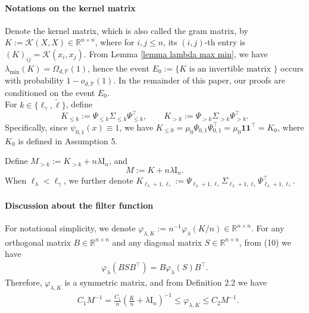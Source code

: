 \documentclass{article}
\theoremstyle{plain}
\theoremstyle{definition}
\theoremstyle{remark}
\newcommand{\reg}{\varphi_\lambda}
\begin{document}
\begin{appendix}
\paragraph*{Notations on the kernel matrix}
Denote the kernel matrix, which is also called the gram matrix, by $K := \mathscr{K}(X, X) \in \mathbb{R}^{n \times n}$, where for $i,j \leq n$, its $(i, j)$-th entry is $(K)_{ij} = \mathscr{K}(x_{i},x_{j})$. From Lemma \ref{lemma lambda max min}, we have $\lambda_{\text{min}}\left( K\right) = \Omega_{d, \mathbb{P}}(1)$, hence the event $E_0 := \{K \text{ is an invertible matrix }\}$ occurs with probability $1-o_{d, \mathbb{P}}(1)$. In the remainder of this paper, our proofs are conditioned on the event $E_0$.\\
For $k \in \{\ell_{\gamma}, \tilde{\ell}\}$, define
$$
K_{\leq k} := \Psi_{\leq k} \Sigma_{\leq k} \Psi_{\leq k}^{\top}, 
\qquad 
K_{>k} := \Psi_{>k} \Sigma_{>k} \Psi_{>k}^{\top}. 
$$
Specifically, since $\psi_{0, 1}(x) \equiv 1$, we have $K_{\leq 0} = \mu_0 \Psi_{0, 1} \Psi_{0, 1}^{\top} = \mu_0 \mathbf{1} \mathbf{1}^{\top} = K_0$, where $K_{0}$ is defined in Assumption 5.

Define $M_{>k} := K_{>k} + n\lambda \mathrm{I}_n$, and
$$
M := K + n\lambda \mathrm{I}_n.
$$
When $\ell_{\lambda}<\ell_{\gamma}$, we further denote $ K_{\ell_{\lambda}+1, \ell_{\gamma}} := \Psi_{\ell_{\lambda}+1, \ell_{\gamma}} \Sigma_{\ell_{\lambda}+1, \ell_{\gamma}} \Psi_{\ell_{\lambda}+1, \ell_{\gamma}}^{\top}$.




\paragraph*{Discussion about the filter function} For notational simplicity, we denote $\varphi_{\lambda, K}:=n^{-1}\reg(K/n) \in \mathbb{R}^{n \times n}$. 
For any orthogonal matrix $B\in \mathbb{R}^{n\times n}$ and any diagonal matrix $S\in \mathbb{R}^{n\times n}$, from (10) we have
\begin{align}
    \label{eq:Filter_Rem_finite_case3}
    \reg(BSB^{\top})=B\reg(S)B^{\top}.
    \end{align}
Therefore, $\varphi_{\lambda, K}$ is a symmetric matrix, and from Definition 2.2 we have
\begin{equation}\label{eqn:spe_properties}
    \begin{aligned}
         &C_1 M^{-1} =   \frac{C_1}{n}\left(\frac{K}{n}+\lambda \mathrm{I}_n \right)^{-1} \leq \varphi_{\lambda, K} \leq  C_2 M^{-1}.
         \\
    \end{aligned}
\end{equation}









\end{appendix}
\end{document}
